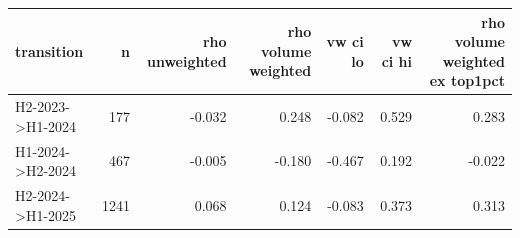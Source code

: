 \begin{tabular}{lrrrrrr}
\toprule
transition & n & rho unweighted & rho volume weighted & vw ci lo & vw ci hi & rho volume weighted ex top1pct \\
\midrule
H2-2023->H1-2024 & 177 & -0.032 & 0.248 & -0.082 & 0.529 & 0.283 \\
H1-2024->H2-2024 & 467 & -0.005 & -0.180 & -0.467 & 0.192 & -0.022 \\
H2-2024->H1-2025 & 1241 & 0.068 & 0.124 & -0.083 & 0.373 & 0.313 \\
\bottomrule
\end{tabular}
